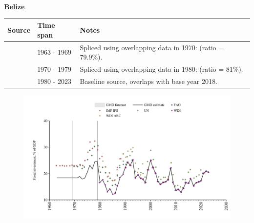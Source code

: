 \documentclass[12pt,a4paper,landscape]{article}
\begin{document}
\begin{adjustbox}{max totalsize={\paperwidth}{\paperheight},center}
\begin{minipage}[t][\textheight][t]{\textwidth}
\vspace*{0.5cm}
{}
\begin{center}
{\Large\bfseries Belize}
\end{center}
\vspace{0.5cm}
\begin{table}[H]
\centering
\small
\begin{tabular}{|l|l|l|}
\hline
\textbf{Source} & \textbf{Time span} & \textbf{Notes} \\
\hline
\rowcolor{white}\cite{IMF_IFS}& 1963 - 1969 &Spliced using overlapping data in 1970: (ratio = 79.9\%).\\
\rowcolor{lightgray}\cite{UN}& 1970 - 1979 &Spliced using overlapping data in 1980: (ratio = 81\%).\\
\rowcolor{white}\cite{WDI}& 1980 - 2023 &Baseline source, overlaps with base year 2018.\\
\hline
\end{tabular}
\end{table}
\begin{figure}[H]
\centering
\includegraphics[width=\textwidth,height=0.6\textheight,keepaspectratio]{graphs/BLZ_finv_GDP.pdf}
\end{figure}
\end{minipage}
\end{adjustbox}
\end{document}
